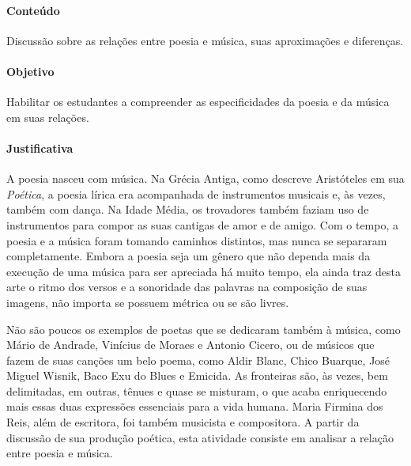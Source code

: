 \documentclass[12pt]{extarticle}
\begin{document}
\paragraph{Conteúdo} Discussão sobre as relações entre poesia e música,
suas aproximações e diferenças.

\paragraph{Objetivo} Habilitar os estudantes a compreender as
especificidades da poesia e da música em suas relações.


\paragraph{Justificativa} A poesia nasceu com música. Na Grécia Antiga,
como descreve Aristóteles em sua \emph{Poética}, a poesia lírica era
acompanhada de instrumentos musicais e, às vezes, também com dança. Na
Idade Média, os trovadores também faziam uso de instrumentos para compor
as suas cantigas de amor e de amigo. Com o tempo, a poesia e a música
foram tomando caminhos distintos, mas nunca se separaram completamente.
Embora a poesia seja um gênero que não dependa mais da execução de uma
música para ser apreciada há muito tempo, ela ainda traz desta arte o
ritmo dos versos e a sonoridade das palavras na composição de suas
imagens, não importa se possuem métrica ou se são livres.

Não são poucos os exemplos de poetas que se dedicaram também à música,
como Mário de Andrade, Vinícius de Moraes e Antonio Cicero, ou de
músicos que fazem de suas canções um belo poema, como Aldir Blanc, Chico
Buarque, José Miguel Wisnik, Baco Exu do Blues e Emicida. As fronteiras
são, às vezes, bem delimitadas, em outras, tênues e quase se misturam, o
que acaba enriquecendo mais essas duas expressões essenciais para a vida
humana. Maria Firmina dos Reis, além de escritora, foi também musicista
e compositora. A partir da discussão de sua produção poética, esta
atividade consiste em analisar a relação entre poesia e música.
\end{document}
